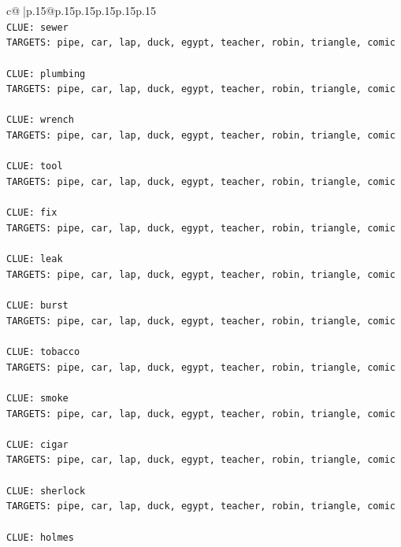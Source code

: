 \documentclass{article}
\begin{document}
{\begin{supertabular}{c@{$\;$}|p{.15\linewidth}@{}p{.15\linewidth}p{.15\linewidth}p{.15\linewidth}p{.15\linewidth}p{.15\linewidth}}
{{{\\ 
\texttt{CLUE: sewer} \\
\texttt{TARGETS: pipe, car, lap, duck, egypt, teacher, robin, triangle, comic} \\
\\ 
\texttt{CLUE: plumbing} \\
\texttt{TARGETS: pipe, car, lap, duck, egypt, teacher, robin, triangle, comic} \\
\\ 
\texttt{CLUE: wrench} \\
\texttt{TARGETS: pipe, car, lap, duck, egypt, teacher, robin, triangle, comic} \\
\\ 
\texttt{CLUE: tool} \\
\texttt{TARGETS: pipe, car, lap, duck, egypt, teacher, robin, triangle, comic} \\
\\ 
\texttt{CLUE: fix} \\
\texttt{TARGETS: pipe, car, lap, duck, egypt, teacher, robin, triangle, comic} \\
\\ 
\texttt{CLUE: leak} \\
\texttt{TARGETS: pipe, car, lap, duck, egypt, teacher, robin, triangle, comic} \\
\\ 
\texttt{CLUE: burst} \\
\texttt{TARGETS: pipe, car, lap, duck, egypt, teacher, robin, triangle, comic} \\
\\ 
\texttt{CLUE: tobacco} \\
\texttt{TARGETS: pipe, car, lap, duck, egypt, teacher, robin, triangle, comic} \\
\\ 
\texttt{CLUE: smoke} \\
\texttt{TARGETS: pipe, car, lap, duck, egypt, teacher, robin, triangle, comic} \\
\\ 
\texttt{CLUE: cigar} \\
\texttt{TARGETS: pipe, car, lap, duck, egypt, teacher, robin, triangle, comic} \\
\\ 
\texttt{CLUE: sherlock} \\
\texttt{TARGETS: pipe, car, lap, duck, egypt, teacher, robin, triangle, comic} \\
\\ 
\texttt{CLUE: holmes} \\
}}}
\end{supertabular}}
\end{document}
